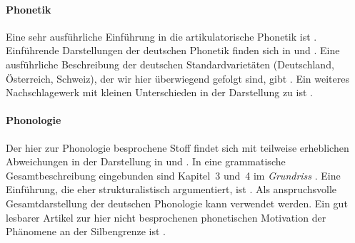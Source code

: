 \WeitereLiteratur

\paragraph*{Phonetik}

Eine sehr ausführliche Einführung in die artikulatorische Phonetik ist \citet{Laver1994}.
Einführende Darstellungen der deutschen Phonetik finden sich \zB in \citet{RuesEa2009} und \citet{Wiese2010}.
Eine ausführliche Beschreibung der deutschen Standardvarietäten (Deutschland, Österreich, Schweiz), der wir hier überwiegend gefolgt sind, gibt \citet{KrechEa2009}.
Ein weiteres Nachschlagewerk mit kleinen Unterschieden in der Darstellung zu \citet{KrechEa2009} ist \citet{Mangold2006}.

\paragraph*{Phonologie}

\label{abs:pholliteratur}

Der hier zur Phonologie besprochene Stoff findet sich mit teilweise erheblichen Abweichungen in der Darstellung \zB in \citet{Hall2000} und \citet{Wiese2010}.
In eine grammatische Gesamtbeschreibung eingebunden sind Kapitel~3 und~4 im \textit{Grundriss} \citep{Eisenberg2013a}.
Eine Einführung, die eher strukturalistisch argumentiert, ist \citet{Ternes2012}.
Als anspruchsvolle Gesamtdarstellung der deutschen Phonologie kann \citet{Wiese2000} verwendet werden.
Ein gut lesbarer Artikel zur hier nicht besprochenen phonetischen Motivation der Phänomene an der Silbengrenze ist \citet{Maas2002}. 

